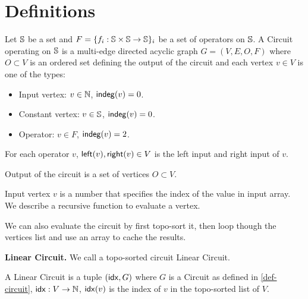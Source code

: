 \section{Definitions}

\begin{definition}[Circuit]
\label{def-circuit}
Let $\S$ be a set and $F = \{f_i: \S \times \S \to \S \}_i$ be a set of operators on $\S$.
A Circuit operating on $\S$ is a multi-edge directed acyclic graph $G = (V, E, O, F)$ where $O \subset V$ is an ordered set defining the output of the circuit and each vertex $v \in V$ is one of the types:
\begin{itemize}
    \item Input vertex: $v \in \N$, $\aIndeg(v) = 0$.
    \item Constant vertex: $v \in \S$, $\aIndeg(v) = 0$.
    \item Operator: $v \in F$, $\aIndeg(v) = 2$.
\end{itemize}
For each operator $v$, $\aLeft(v), \aRight(v) \in V$ is the left input and right input of $v$.

Output of the circuit is a set of vertices $O \subset V$.
\end{definition}

Input vertex $v$ is a number that specifies the index of the value in input array. We describe a recursive function to evaluate a vertex.

 
We can also evaluate the circuit by first topo-sort it, then loop though the vertices list and use an array to cache the results.

\textbf{Linear Circuit.} We call a topo-sorted circuit Linear Circuit.

\begin{definition}
\label{def-linear-circuit}
A Linear Circuit is a tuple $(\aIdx, G)$ where $G$ is a Circuit as defined in \ref{def-circuit}, $\aIdx: V \to \N$, $\aIdx(v)$ is the index of $v$ in the topo-sorted list of $V$.
\end{definition}

